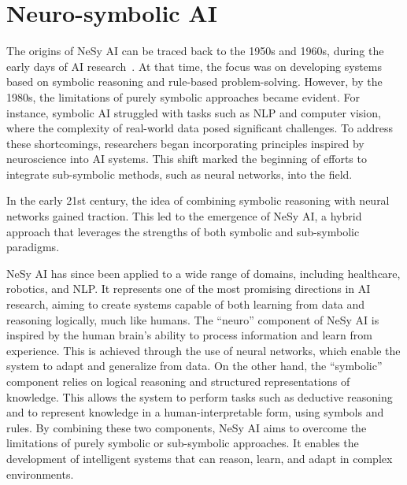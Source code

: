 
\chapter{Neuro-symbolic AI}
\label{ch:nesy-ai}
\minitoc

The origins of \gls{NeSy} \gls{AI} can be traced back to the 1950s and 1960s, during the early days of \gls{AI} research~\cite{Youheng_2023}.
%
At that time, the focus was on developing systems based on symbolic reasoning and rule-based problem-solving.
%
However, by the 1980s, the limitations of purely symbolic approaches became evident.
%
For instance, symbolic \gls{AI} struggled with tasks such as \gls{NLP} and computer vision, where the complexity of real-world data posed significant challenges.
%
To address these shortcomings, researchers began incorporating principles inspired by neuroscience into \gls{AI} systems.
%
This shift marked the beginning of efforts to integrate sub-symbolic methods, such as neural networks, into the field.

In the early 21st century, the idea of combining symbolic reasoning with neural networks gained traction.
%
This led to the emergence of \gls{NeSy} \gls{AI}, a hybrid approach that leverages the strengths of both symbolic and sub-symbolic paradigms.


\Gls{NeSy} \gls{AI} has since been applied to a wide range of domains, including healthcare, robotics, and \gls{NLP}.
%
It represents one of the most promising directions in \gls{AI} research, aiming to create systems capable of both learning from data and reasoning logically, much like humans.
%
The ``neuro'' component of \gls{NeSy} \gls{AI} is inspired by the human brain's ability to process information and learn from experience.
%
This is achieved through the use of neural networks, which enable the system to adapt and generalize from data.
%
On the other hand, the ``symbolic'' component relies on logical reasoning and structured representations of knowledge.
%
This allows the system to perform tasks such as deductive reasoning and to represent knowledge in a human-interpretable form, using symbols and rules.
%
By combining these two components, \gls{NeSy} \gls{AI} aims to overcome the limitations of purely symbolic or sub-symbolic approaches.
%
It enables the development of intelligent systems that can reason, learn, and adapt in complex environments.


